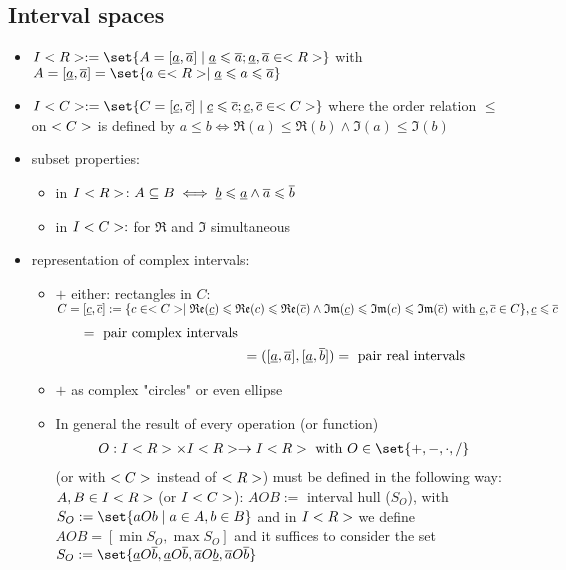 \subsection*{Interval spaces}
	\begin{itemize}
		\item $I\R:=\set{A=[\minval{a},\maxval{a}]\mid \minval{a}\le \maxval{a}; \minval{a},\maxval{a} \in \R}$ with $A = [\minval{a},\maxval{a}] = \set{a \in \R \mid \minval{a} \le a \le \maxval{a}}$
		\item $I\C:=\set{C=[\minval{c},\maxval{c}]\mid \minval{c}\le \maxval{c}; \minval{c},\maxval{c}\in \C}$ where the order relation $\le$ on $<C>$ is defined by $a\le b \iff \Re(a)\le \Re(b) \land \Im(a)\le \Im(b)$
		\item subset properties:
		\begin{itemize}
			\item in $I<R>\colon A\subseteq B \iff \underline{b}\leqslant \underline{a} \land \overline{a}\leqslant \overline{b}$
			\item in $I<C>: $ for $\Re$ and $\Im$ simultaneous
		\end{itemize}
	\item representation of complex intervals:
	\begin{itemize}
		\item $+$ either: rectangles in $C$:
		$C=[\underline{c},\overline{c}]:=\{c\in <C>\mid \mathfrak{Re}(\underline{c})\leqslant \mathfrak{Re}(c)\leqslant \mathfrak{Re}(\overline{c}) \land \mathfrak{Im}(\underline{c})\leqslant \mathfrak{Im}(c)\leqslant \mathfrak{Im}(\overline{c}) \text{ with } \underline{c},\overline{c}\in C\}, \underline{c}\leqslant \overline{c}$
		\begin{align*}
					[\minval{c},\maxval{c}&=[(\minval{a},\minval{b}),(\maxval{a},\maxval{b})]=\text{ pair complex intervals }\\
			&=([\minval{a},\maxval{a}],[\minval{a},\maxval{b}])=\text{ pair real intervals }
		\end{align*}
		\item $+$ as complex "circles" or even ellipse
		\item In general the result of every operation (or function)
		\begin{align*}
			O: I\R\times I\R \to I\R\with O\in\set{+,-,\cdot,/}
		\end{align*}
		(or with $<C>$ instead of $<R>$) must be defined in the following way:\\ 
		$A,B\in I<R>$ (or $I<C>$): $A O B:=$ interval hull ($S_O$), with $S_O:=\set{a O b \mid a\in A, b\in B}$ and in $I<R>$ we define $A O B=[\min S_O, \max S_O]$ and it suffices to consider the set $S_O:=\set{\minval{a} O \maxval{b}, \minval{a} O \maxval{b},\maxval{a} O \minval{b},\maxval{a} O \maxval{b}}$

\end{itemize}
\end{itemize}
